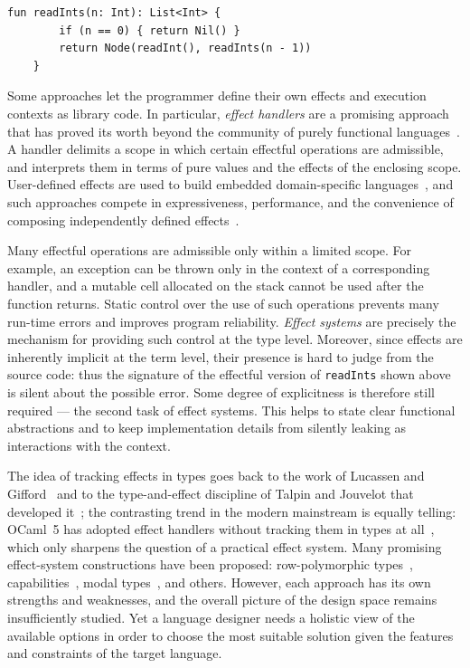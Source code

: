 \documentclass[11pt]{article}
\begin{document}
\noindent\begin{minipage}{\linewidth}
\begin{lstlisting}[language=colang]
    fun readInts(n: Int): List<Int> {
        if (n == 0) { return Nil() }
        return Node(readInt(), readInts(n - 1))
    }
\end{lstlisting}
\end{minipage}

Some approaches let the programmer define their own effects and execution contexts as
library code. In particular, \emph{effect handlers} are a promising approach that has
proved its worth beyond the community of purely functional
languages~\cite{plotkin2013handling, chandrasekaran2018algebraic, phipps2023continuing}.
A handler delimits a scope in which certain effectful operations are admissible, and
interprets them in terms of pure values and the effects of the enclosing scope.
User-defined effects are used to build embedded domain-specific
languages~\cite{leijen2017structured}, and such approaches compete in expressiveness,
performance, and the convenience of composing independently defined
effects~\cite{liang1995monad, kiselyov2013extensible, schrijvers2019monad,
van2024framework}.

Many effectful operations are admissible only within a limited scope. For example, an
exception can be thrown only in the context of a corresponding handler, and a mutable
cell allocated on the stack cannot be used after the function returns. Static control
over the use of such operations prevents many run-time errors and improves program
reliability. \emph{Effect systems} are precisely the mechanism for providing such
control at the type level. Moreover, since effects are inherently implicit at the term
level, their presence is hard to judge from the source code: thus the signature of the
effectful version of \lstinline|readInts| shown above is silent about the possible
error. Some degree of explicitness is therefore still required --- the second task of
effect systems. This helps to state clear functional abstractions and to keep
implementation details from silently leaking as interactions with the context.

The idea of tracking effects in types goes back to the work of Lucassen and
Gifford~\cite{lucassen1988polymorphic} and to the type-and-effect discipline of Talpin
and Jouvelot that developed it~\cite{talpin1994type}; the contrasting trend in the modern
mainstream is equally telling: OCaml~5 has adopted effect handlers without tracking them in
types at all~\cite{sivaramakrishnan2021retrofitting}, which only sharpens the question
of a practical effect system. Many promising effect-system constructions have been
proposed: row-polymorphic types~\cite{leijen2014koka},
capabilities~\cite{brachthauser2022effects, boruch2023capturing}, modal
types~\cite{tang2025modal}, and others. However, each approach has its own strengths and
weaknesses, and the overall picture of the design space remains insufficiently studied.
Yet a language designer needs a holistic view of the available options in order to
choose the most suitable solution given the features and constraints of the target
language.
\end{document}

